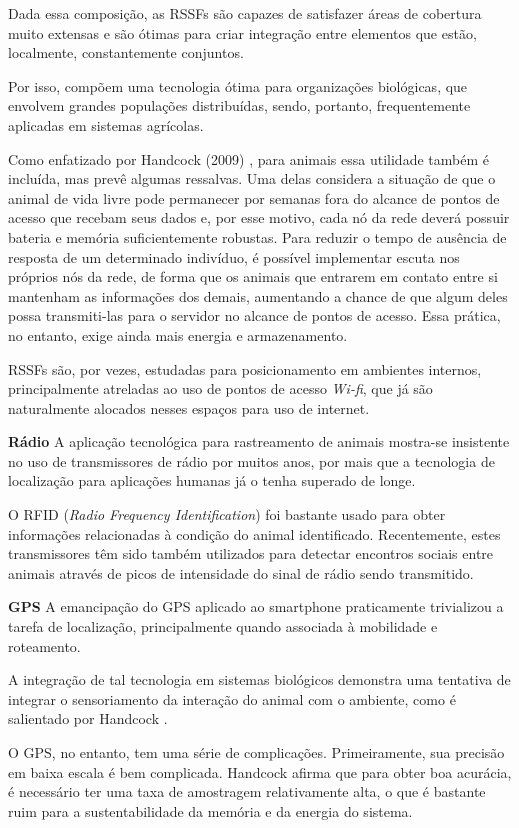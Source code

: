 Dada essa composição, as RSSFs são capazes de satisfazer áreas de cobertura muito extensas e são ótimas para criar integração entre elementos que estão, localmente, constantemente conjuntos.

Por isso, compõem uma tecnologia ótima para organizações biológicas, que envolvem grandes populações distribuídas, sendo, portanto, frequentemente aplicadas em sistemas agrícolas.

Como enfatizado por Handcock (2009) \cite{handcock}, para animais essa utilidade também é incluída, mas prevê algumas ressalvas. Uma delas considera a situação de que o animal de vida livre pode permanecer por semanas fora do alcance de pontos de acesso que recebam seus dados e, por esse motivo, cada nó da rede deverá possuir bateria e memória suficientemente robustas. Para reduzir o tempo de ausência de resposta de um determinado indivíduo, é possível implementar escuta nos próprios nós da rede, de forma que os animais que entrarem em contato entre si mantenham as informações dos demais, aumentando a chance de que algum deles possa transmiti-las para o servidor no alcance de pontos de acesso. Essa prática, no entanto, exige ainda mais energia e armazenamento.

RSSFs são, por vezes, estudadas para posicionamento em ambientes internos, principalmente atreladas ao uso de pontos de acesso \emph{Wi-fi}, que já são naturalmente alocados nesses espaços para uso de internet.

\textbf{Rádio}
A aplicação tecnológica para rastreamento de animais mostra-se insistente no uso de transmissores de rádio por muitos anos, por mais que a tecnologia de localização para aplicações humanas já o tenha superado de longe.

O RFID (\emph{Radio Frequency Identification}) foi bastante usado para obter informações relacionadas à condição do animal identificado. Recentemente, estes transmissores têm sido também utilizados para detectar encontros sociais entre animais através de picos de intensidade do sinal de rádio sendo transmitido.

\textbf{GPS}
A emancipação do GPS aplicado ao smartphone praticamente trivializou a tarefa de localização, principalmente quando associada à mobilidade e roteamento.

A integração de tal tecnologia em sistemas biológicos demonstra uma tentativa de integrar o sensoriamento da interação do animal com o ambiente, como é salientado por Handcock \cite{handcock}.

O GPS, no entanto, tem uma série de complicações. Primeiramente, sua precisão em baixa escala é bem complicada. Handcock afirma que para obter boa acurácia, é necessário ter uma taxa de amostragem relativamente alta, o que é bastante ruim para a sustentabilidade da memória e da energia do sistema.

